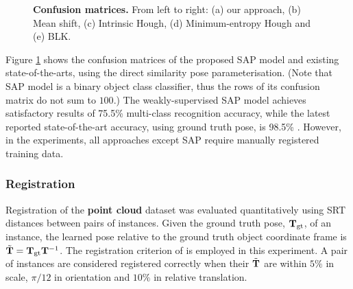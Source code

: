 \begin{figure}[ht]
\begin{subfigure}[t]{0.32\linewidth}
	\end{subfigure}
	\caption{\textbf{Confusion matrices.} From left to right: (a) our approach, (b) Mean shift, (c) Intrinsic Hough, (d) Minimum-entropy Hough and (e) BLK.}
	\label{fig/reg/recresult3d}
\end{figure}




Figure \ref{fig/reg/recresult3d} shows the confusion matrices of the proposed SAP model and existing state-of-the-arts, using the direct similarity pose parameterisation. (Note that SAP model is a binary object class classifier, thus the rows of its confusion matrix do not sum to $100$.)
The weakly-supervised SAP model achieves satisfactory results of 75.5\% multi-class recognition accuracy, while the latest reported state-of-the-art accuracy, using ground truth pose, is 98.5\% \cite{Woodford2013}. However, in the experiments, all approaches except SAP require manually registered training data.    

\subsubsection{Registration} 
\label{sec/reg/reg}
Registration of the \textbf{point cloud} dataset was evaluated quantitatively using SRT distances \cite{Pham2011} between pairs of instances. Given the ground truth pose, $\mathbf{T}_\mathrm{gt}$, of an instance, the learned pose relative to the ground truth object coordinate frame is $\tilde{\mathbf{T}} = \mathbf{T}_\mathrm{gt}\mathbf{T}^{-1}$.  
The registration criterion of \cite{Pham2011} is employed in this experiment. A pair of instances are considered registered correctly when their $\tilde{\mathbf{T}}$ are within $5\%$ in scale, $\pi/12$ in orientation and $10\%$ in relative translation.

